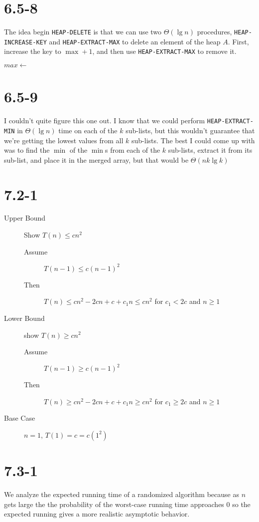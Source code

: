 \documentclass[11pt]{article}
\begin{document}
\section{6.5-8}
The idea begin \texttt{HEAP-DELETE} is that we can use two
\(\Theta (\lg n)\)
procedures, \texttt{HEAP-INCREASE-KEY} and \texttt{HEAP-EXTRACT-MAX}
to delete an element of the heap \(A\).
First, increase the key to \(\max + 1\),
and then use \texttt{HEAP-EXTRACT-MAX} to remove it.

\begin{algorithm}
  \begin{algorithmic}
     \State $max \gets$
    \State {}
    \State {}
    \EndProcedure
  \end{algorithmic}
\end{algorithm}
\section{6.5-9}
I couldn't quite figure this one out.  I know that we could perform
\texttt{HEAP-EXTRACT-MIN} in \(\Theta(\lg n)\)
time on each of the \(k\)
sub-lists, but this wouldn't guarantee that we're getting the lowest
values from all \(k\)
sub-lists.  The best I could come up with was to find the \(\min\)
of the \(\min\)s
from each of the \(k\)
sub-lists, extract it from its sub-list, and place it in the merged
array, but that would be \(\Theta(nk\lg k)\)
\section{7.2-1}
\begin{description}
\item[Upper Bound] Show \(T(n) \le c n^2\)
  \begin{description}
  \item[Assume] \(T(n-1) \le c (n-1)^2\)
  \item[Then] \(T(n) \le c n^2 - 2 cn + c + c_1 n \le cn^2\)
    for \(c_1 < 2c\) and \(n \ge 1\)
  \end{description}
\item[Lower Bound] show \(T(n) \ge c n^2\)
  \begin{description}
  \item[Assume] \(T(n-1) \ge c(n-1)^2\)
  \item[Then] \(T(n) \ge cn^2 -2cn + c + c_1n \ge cn^2\)
    for \(c_1 \ge 2c\) and \(n \ge 1\)
  \end{description}
\item[Base Case] \(n=1\), \(T(1) = c = c (1^2)\)
\end{description}
\section{7.3-1}
We analyze the expected running time of a randomized algorithm because
as \(n\)
gets large the the probability of the worst-case running
time approaches \(0\)
so the expected running gives a more realistic asymptotic behavior.
\end{document}
